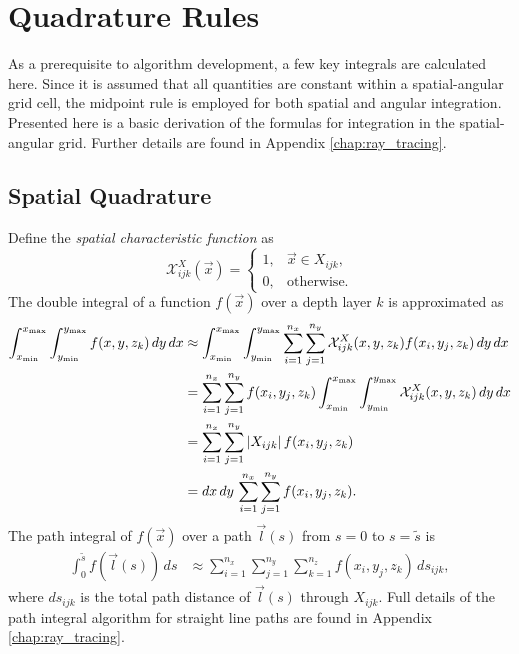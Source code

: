 \section{Quadrature Rules}
As a prerequisite to algorithm development, a few key integrals are calculated here.
Since it is assumed that all quantities are constant within a spatial-angular grid cell,
the midpoint rule is employed for both spatial and angular integration.
Presented here is a basic derivation of the formulas for integration in the spatial-angular grid.
Further details are found in Appendix \ref{chap:ray_tracing}.

\subsection{Spatial Quadrature}
Define the \textit{spatial characteristic function} as
\begin{equation*}
  \mathcal{X}^X_{ijk}(\vec{x}) = \begin{cases}
    1, & \vec{x} \in X_{ijk}, \\
    0, & \mbox{otherwise}.
  \end{cases}
\end{equation*}
The double integral of a function $f(\vec{x})$ over a depth layer $k$ is approximated as
\begin{align*}
  \int_{x_{\min}}^{x_{\max}}\int_{y_{\min}}^{y_{\max}} f(x, y, z_k)\, dy\, dx &\approx \int_{x_{\min}}^{x_{\max}} \int_{y_{\min}}^{y_{\max}} \sum_{i=1}^{n_x}\sum_{j=1}^{n_y} \mathcal{X}^X_{ijk}(x,y,z_k) f(x_i, y_j, z_k)\, dy\, dx \\
  &= \sum_{i=1}^{n_x}\sum_{j=1}^{n_y} f(x_i, y_j, z_k) \int_{x_{\min}}^{x_{\max}} \int_{y_{\min}}^{y_{\max}} \mathcal{X}^X_{ijk}(x,y,z_k) \, dy\, dx \\
  &= \sum_{i=1}^{n_x}\sum_{j=1}^{n_y} \left| X_{ijk} \right| f(x_i, y_j, z_k) \\
  &= dx\, dy\, \sum_{i=1}^{n_x}\sum_{j=1}^{n_y} f(x_i, y_j, z_k).
\end{align*}
The path integral of $f(\vec{x})$ over a path $\vec{l}(s)$ from $s=0$ to $s=\tilde{s}$ is
\begin{align*}
  \int_0^{\tilde{s}} f(\vec{l}(s))\, ds &\approx \sum_{i=1}^{n_x}\sum_{j=1}^{n_y}\sum_{k=1}^{n_z} f(x_i, y_j, z_k)\, ds_{ijk},
\end{align*}
where $ds_{ijk}$ is the total path distance of $\vec{l}(s)$ through $X_{ijk}$.
Full details of the path integral algorithm for straight line paths are found in Appendix \ref{chap:ray_tracing}.

